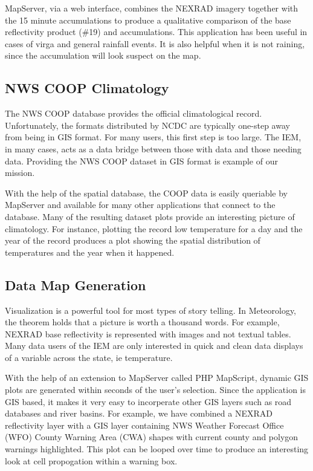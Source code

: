 \documentclass[twocolumn]{article}
\begin{document}
MapServer, via a web interface, combines the NEXRAD imagery together with the
15 minute accumulations to produce a qualitative comparison of the base
reflectivity product (\#19) and accumulations.  This application has been 
useful in cases of virga and general rainfall events.  It is also helpful when
it is not raining, since the accumulation will look suspect on the map.

\subsection{NWS COOP Climatology}

The NWS COOP database provides the official climatological record. 
Unfortunately, the formats distributed by NCDC are typically one-step away 
from being in GIS format.  For many users, this first step is too large.  The
IEM, in many cases, acts as a data bridge between those with data and those
needing data.  Providing the NWS COOP dataset in GIS format is example of 
our mission.

With the help of the spatial database, the COOP data is easily queriable by
MapServer and available for many other applications that connect to the
database.  Many of the resulting dataset plots provide an interesting picture
of climatology.  For instance, plotting the record low temperature for a day 
and the year of the record produces a plot showing the spatial distribution 
of temperatures and the year when it happened.


\subsection{Data Map Generation}

Visualization is a powerful tool for most types of story telling.  In 
Meteorology, the theorem holds that a picture is worth a thousand words.  For
example, NEXRAD base reflectivity is represented with images and not textual 
tables.  Many data users of the IEM are only interested in quick and clean 
data displays of a variable across the state, ie temperature.

With the help of an extension to MapServer called PHP MapScript, dynamic GIS 
plots are generated within seconds of the user's selection.
  Since the application is GIS based, it makes it very easy to incorperate 
other GIS layers such as road databases and river basins.  For example, we have
combined a NEXRAD reflectivity layer with a GIS layer containing NWS Weather Forecast Office (WFO) County Warning Area (CWA) shapes with current county and 
polygon warnings highlighted.  This plot can be looped over time to produce
an interesting look at cell propogation within a warning box.
\end{document}
